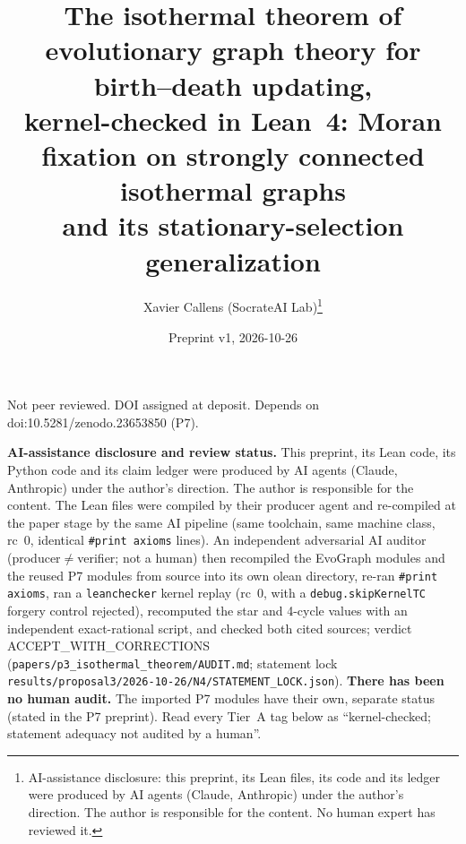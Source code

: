 \documentclass[11pt]{article}
\title{The isothermal theorem of evolutionary graph theory for birth--death updating,\\
kernel-checked in Lean~4: Moran fixation on strongly connected isothermal graphs\\
and its stationary-selection generalization}
\author{Xavier Callens (SocrateAI Lab)\thanks{AI-assistance disclosure: this preprint, its Lean files, its code and its ledger were produced by AI agents (Claude, Anthropic) under the author's direction. The author is responsible for the content. No human expert has reviewed it.}}
\date{Preprint v1, 2026-10-26}
\begin{document}
\maketitle
\begin{center}\small Not peer reviewed. DOI assigned at deposit. Depends on doi:10.5281/zenodo.23653850 (P7).\end{center}

\noindent\textbf{AI-assistance disclosure and review status.} This preprint, its Lean code, its Python code and its claim ledger were
produced by AI agents (Claude, Anthropic) under the author's direction. The author is responsible for the content. The Lean files
were compiled by their producer agent and re-compiled at the paper stage by the same AI pipeline (same toolchain, same machine class, rc~0,
identical \texttt{\#print axioms} lines). An independent adversarial AI auditor (producer${}\neq{}$verifier; not a human) then recompiled the EvoGraph modules and the reused P7 modules from source into its own olean directory,
re-ran \texttt{\#print axioms}, ran a \texttt{leanchecker} kernel replay (rc~0, with a \texttt{debug.skipKernelTC} forgery control rejected), recomputed the star and 4-cycle values with an independent exact-rational script, and checked both cited sources;
verdict ACCEPT\_WITH\_CORRECTIONS (\texttt{papers/p3\_isothermal\_theorem/AUDIT.md}; statement lock \texttt{results/proposal3/2026-10-26/N4/STATEMENT\_LOCK.json}). \textbf{There has been no human audit.}
The imported P7 modules have their own, separate status
(stated in the P7 preprint). Read every Tier~A tag below as ``kernel-checked; statement adequacy not audited by a human''.
\end{document}

